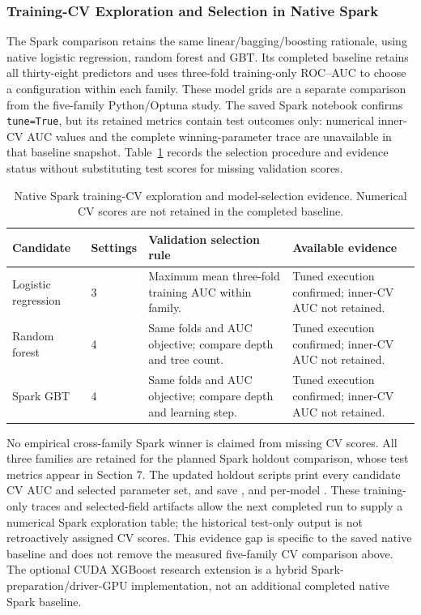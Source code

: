 \subsubsection{Training-CV Exploration and Selection in Native Spark}
The Spark comparison retains the same linear/bagging/boosting rationale, using native logistic regression, random forest and GBT. Its completed baseline retains all thirty-eight predictors and uses three-fold training-only ROC--AUC to choose a configuration within each family. These model grids are a separate comparison from the five-family Python/Optuna study. The saved Spark notebook confirms \texttt{tune=True}, but its retained metrics contain test outcomes only: numerical inner-CV AUC values and the complete winning-parameter trace are unavailable in that baseline snapshot. Table~\ref{tab:spark-cv-exploration} records the selection procedure and evidence status without substituting test scores for missing validation scores.

\begin{table}[H]
\centering\small
\caption{Native Spark training-CV exploration and model-selection evidence. Numerical CV scores are not retained in the completed baseline.}
\label{tab:spark-cv-exploration}
\begin{tabularx}{\textwidth}{@{}p{2.7cm}p{1.5cm}XX@{}}
\toprule
Candidate & Settings & Validation selection rule & Available evidence \\
\midrule
Logistic regression & 3 & Maximum mean three-fold training AUC within family. & Tuned execution confirmed; inner-CV AUC not retained. \\
Random forest & 4 & Same folds and AUC objective; compare depth and tree count. & Tuned execution confirmed; inner-CV AUC not retained. \\
Spark GBT & 4 & Same folds and AUC objective; compare depth and learning step. & Tuned execution confirmed; inner-CV AUC not retained. \\
\bottomrule
\end{tabularx}
\end{table}

No empirical cross-family Spark winner is claimed from missing CV scores. All three families are retained for the planned Spark holdout comparison, whose test metrics appear in Section 7. The updated holdout scripts print every candidate CV AUC and selected parameter set, and save ,  and per-model . These training-only traces and selected-field artifacts allow the next completed run to supply a numerical Spark exploration table; the historical test-only output is not retroactively assigned CV scores. This evidence gap is specific to the saved native baseline and does not remove the measured five-family CV comparison above. The optional CUDA XGBoost research extension is a hybrid Spark-preparation/driver-GPU implementation, not an additional completed native Spark baseline.

